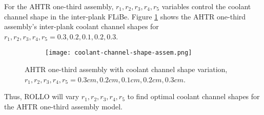 For the \gls{AHTR} one-third assembly, $r_1, r_2, r_3, r_4, r_5$ variables control the
coolant channel shape in the inter-plank \gls{FLiBe}. 
Figure \ref{fig:coolant-channel-shape-assem} shows the \gls{AHTR} one-third assembly's 
inter-plank coolant channel shapes for $r_1, r_2, r_3, r_4, r_5 = 0.3, 0.2, 0.1, 0.2, 0.3$.
\begin{figure}[htbp]
    \centering
    \begin{subfigure}{.8\textwidth}
    \texttt{[image: coolant-channel-shape-assem.png]}
    \end{subfigure}%
    \begin{subfigure}{.2\textwidth}
        \vspace{1cm}
    \end{subfigure}
    \caption{\acrfull{AHTR} one-third assembly with coolant channel shape variation, 
    $r_1, r_2, r_3, r_4, r_5 = 0.3cm, 0.2cm, 0.1cm, 0.2cm, 0.3cm$.}
    \label{fig:coolant-channel-shape-assem}
\end{figure}
Thus, \gls{ROLLO} will vary $r_1, r_2, r_3, r_4, r_5$ to find optimal coolant 
channel shapes for the \gls{AHTR} one-third assembly model.

